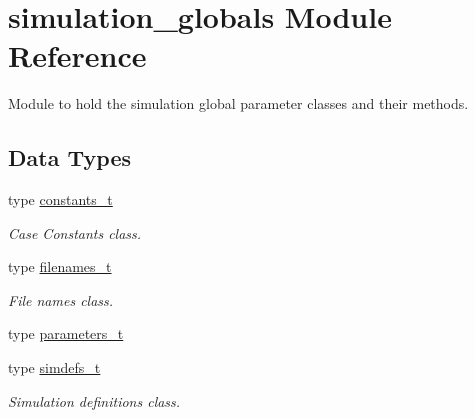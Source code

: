 \hypertarget{namespacesimulation__globals}{}\section{simulation\+\_\+globals Module Reference}
\label{namespacesimulation__globals}


Module to hold the simulation global parameter classes and their methods.  


\subsection*{Data Types}
\begin{DoxyCompactItemize}
\item 
type \mbox{\hyperlink{structsimulation__globals_1_1constants__t}{constants\+\_\+t}}
\begin{DoxyCompactList}\small\item\em Case Constants class. \end{DoxyCompactList}\item 
type \mbox{\hyperlink{structsimulation__globals_1_1filenames__t}{filenames\+\_\+t}}
\begin{DoxyCompactList}\small\item\em File names class. \end{DoxyCompactList}\item 
type \mbox{\hyperlink{structsimulation__globals_1_1parameters__t}{parameters\+\_\+t}}
\item 
type \mbox{\hyperlink{structsimulation__globals_1_1simdefs__t}{simdefs\+\_\+t}}
\begin{DoxyCompactList}\small\item\em Simulation definitions class. \end{DoxyCompactList}\end{DoxyCompactItemize}
